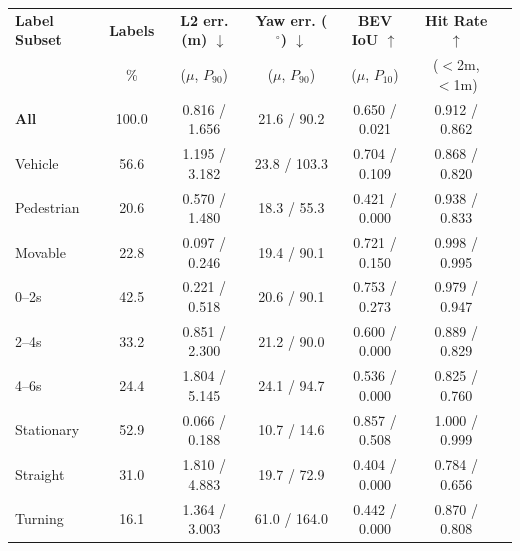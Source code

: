 \begin{tabular}{lcccccc}
\toprule
\textbf{Label Subset} & \textbf{Labels} & \textbf{L2 err. (m) $\downarrow$} & \textbf{Yaw err. ($^\circ$) $\downarrow$} & \textbf{BEV IoU $\uparrow$} & \textbf{Hit Rate $\uparrow$} \\
 & \% & ($\mu$, $P_{90}$) & ($\mu$, $P_{90}$) & ($\mu$, $P_{10}$) & ($<$2m, $<$1m) \\
\midrule \midrule
\textbf{All} & 100.0 & 0.816 / 1.656 & 21.6 / 90.2 & 0.650 / 0.021 & 0.912 / 0.862 \\
\midrule
Vehicle & 56.6 & 1.195 / 3.182 & 23.8 / 103.3 & 0.704 / 0.109 & 0.868 / 0.820 \\
Pedestrian & 20.6 & 0.570 / 1.480 & 18.3 / 55.3 & 0.421 / 0.000 & 0.938 / 0.833 \\
Movable & 22.8 & 0.097 / 0.246 & 19.4 / 90.1 & 0.721 / 0.150 & 0.998 / 0.995 \\
\midrule
0--2s & 42.5 & 0.221 / 0.518 & 20.6 / 90.1 & 0.753 / 0.273 & 0.979 / 0.947 \\
2--4s & 33.2 & 0.851 / 2.300 & 21.2 / 90.0 & 0.600 / 0.000 & 0.889 / 0.829 \\
4--6s & 24.4 & 1.804 / 5.145 & 24.1 / 94.7 & 0.536 / 0.000 & 0.825 / 0.760 \\
\midrule
Stationary & 52.9 & 0.066 / 0.188 & 10.7 / 14.6 & 0.857 / 0.508 & 1.000 / 0.999 \\
Straight & 31.0 & 1.810 / 4.883 & 19.7 / 72.9 & 0.404 / 0.000 & 0.784 / 0.656 \\
Turning & 16.1 & 1.364 / 3.003 & 61.0 / 164.0 & 0.442 / 0.000 & 0.870 / 0.808 \\
\bottomrule
\end{tabular}

